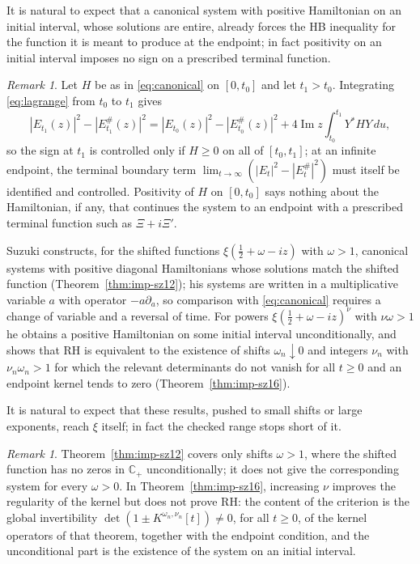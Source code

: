 \documentclass[11pt]{amsart}
\theoremstyle{plain}
\theoremstyle{definition}
\theoremstyle{remark}
\newtheorem{remark}[theorem]{Remark}
\numberwithin{equation}{section}
\newcommand{\Cp}{\mathbb{C}_{+}}
\DeclareMathOperator{\Ima}{Im}
\renewcommand{\Im}{\Ima}
\begin{document}
It is natural to expect that a canonical system with positive
Hamiltonian on an initial interval, whose solutions are entire, already
forces the HB inequality for the function it is meant to produce at
the endpoint; in fact positivity on an initial interval imposes no sign
on a prescribed terminal function.

\begin{remark}\label{rem:N-short-interval}
Let $H$ be as in \eqref{eq:canonical} on $[0,t_0]$ and let $t_1>t_0$.
Integrating \eqref{eq:lagrange} from $t_0$ to $t_1$ gives
\[
|E_{t_1}(z)|^2-|E_{t_1}^\#(z)|^2
=|E_{t_0}(z)|^2-|E_{t_0}^\#(z)|^2
+4\Im z\int_{t_0}^{t_1}Y^*HY\,du,
\]
so the sign at $t_1$ is controlled only if $H\ge0$ on all of
$[t_0,t_1]$; at an infinite endpoint, the terminal boundary term
$\lim_{t\to\infty}(|E_t|^2-|E_t^\#|^2)$ must itself be identified and
controlled. Positivity of $H$ on $[0,t_0]$ says nothing about the
Hamiltonian, if any, that continues the system to an endpoint with a
prescribed terminal function such as $\Xi+i\Xi'$.
\end{remark}

Suzuki constructs, for the shifted functions $\xi(\tfrac12+\omega-iz)$
with $\omega>1$, canonical systems with positive diagonal Hamiltonians
whose solutions match the shifted function
(Theorem~\ref{thm:imp-sz12}); his systems are written in a
multiplicative variable $a$ with operator $-a\partial_a$, so comparison
with \eqref{eq:canonical} requires a change of variable and a reversal
of time. For powers $\xi(\tfrac12+\omega-iz)^\nu$ with $\nu\omega>1$ he
obtains a positive Hamiltonian on some initial interval unconditionally,
and shows that RH is equivalent to the existence of shifts
$\omega_n\downarrow0$ and integers $\nu_n$ with $\nu_n\omega_n>1$ for
which the relevant determinants do not vanish for all $t\ge0$ and an
endpoint kernel tends to zero (Theorem~\ref{thm:imp-sz16}).

It is natural to expect that these results, pushed to small shifts or
large exponents, reach $\xi$ itself; in fact the checked range stops
short of it.

\begin{remark}\label{rem:N-suzuki-range}
Theorem~\ref{thm:imp-sz12} covers only shifts $\omega>1$, where the
shifted function has no zeros in $\Cp$ unconditionally; it does not
give the corresponding system for every $\omega>0$. In
Theorem~\ref{thm:imp-sz16}, increasing $\nu$ improves the regularity of
the kernel but does not prove RH: the content of the criterion is the
global invertibility $\det(1\pm K^{\omega_n,\nu_n}[t])\ne0$, for all
$t\ge0$, of the kernel operators of that theorem, together with the
endpoint condition, and the unconditional part is the existence of the
system on an initial interval.
\end{remark}
\end{document}
